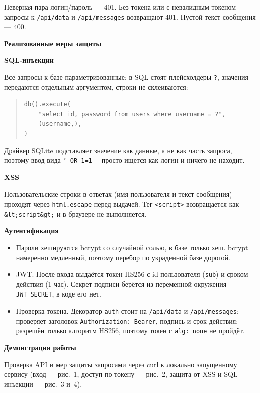 \documentclass[14pt,a4paper]{extarticle}
\newcommand{\head}[1]{%
  \par\vspace{0.9em}%
  \noindent\textbf{#1}\par\vspace{0.35em}%
}
\begin{document}
Неверная пара логин/пароль --- 401. Без токена или с невалидным токеном запросы к \texttt{/api/data} и \texttt{/api/messages} возвращают 401. Пустой текст сообщения --- 400.

\head{Реализованные меры защиты}

\textbf{SQL-инъекции}

Все запросы к базе параметризованные: в SQL стоят плейсхолдеры \texttt{?}, значения передаются отдельным аргументом, строки не склеиваются:

\begin{quote}
\begin{verbatim}
db().execute(
    "select id, password from users where username = ?",
    (username,),
)
\end{verbatim}
\end{quote}

Драйвер SQLite подставляет значение как данные, а не как часть запроса, поэтому ввод вида \texttt{' OR 1=1 --} просто ищется как логин и ничего не находит.

\textbf{XSS}

Пользовательские строки в ответах (имя пользователя и текст сообщения) проходят через \texttt{html.escape} перед выдачей. Тег \texttt{<script>} возвращается как \texttt{\&lt;script\&gt;} и в браузере не выполняется.

\textbf{Аутентификация}

\begin{itemize}
  \item Пароли хешируются bcrypt со случайной солью, в базе только хеш. bcrypt намеренно медленный, поэтому перебор по украденной базе дорогой.
  \item JWT. После входа выдаётся токен HS256 с id пользователя (\texttt{sub}) и сроком действия (1 час). Секрет подписи берётся из переменной окружения \texttt{JWT\_SECRET}, в коде его нет.
  \item Проверка токена. Декоратор \texttt{auth} стоит на \texttt{/api/data} и \texttt{/api/messages}: проверяет заголовок \texttt{Authorization: Bearer}, подпись и срок действия; разрешён только алгоритм HS256, поэтому токен с \texttt{alg: none} не пройдёт.
\end{itemize}

\head{Демонстрация работы}

Проверка API и мер защиты запросами через curl к локально запущенному сервису (вход --- рис.~1, доступ по токену --- рис.~2, защита от XSS и SQL-инъекции --- рис.~3 и~4).
\end{document}
